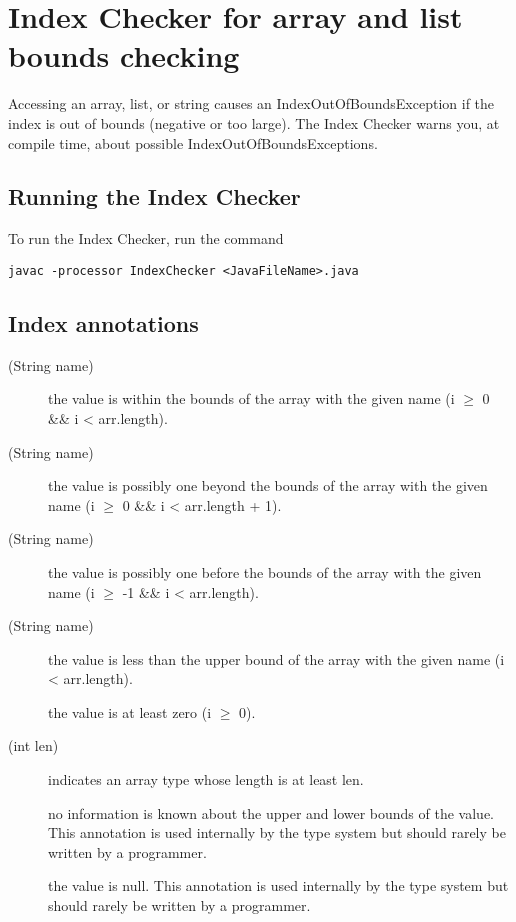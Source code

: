 \chapter{Index Checker for array and list bounds checking\label{index-checker}}

Accessing an array, list, or string causes an IndexOutOfBoundsException
if the index is out of bounds (negative or too large).
The Index Checker warns you, at compile time, about possible
IndexOutOfBoundsExceptions.


\section{Running the Index Checker\label{index-running}}

To run the Index Checker, run the command

\begin{Verbatim}
javac -processor IndexChecker <JavaFileName>.java
\end{Verbatim}


\section{Index annotations\label{index-annotations}}

\begin{description}
\item[(String name)]
	the value is within the bounds of the array with the given
	name (i $\ge$ 0 \&\& i < arr.length).
\item[(String name)]
	the value is possibly one beyond the bounds of the array with
	the given name (i $\ge$ 0 \&\& i < arr.length + 1).
\item[(String name)]
	the value is possibly one before the bounds of the array with the
	given name (i $\ge$ -1 \&\& i < arr.length).
\item[(String name)]
	the value is less than the upper bound of the array with the given
	name (i < arr.length).
\item[]
	the value is at least zero (i $\ge$ 0).
\item[(int len)]
	indicates an array type whose length is at least len.
\item[]
        no information is known about the upper and lower bounds of the value.
        This annotation is used internally by the type system but should rarely
        be written by a programmer.
\item[]
        the value is null.
        This annotation is used internally by the type system but should rarely
        be written by a programmer.
\end{description}

